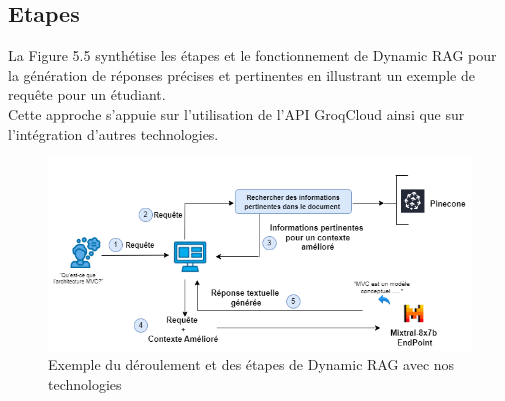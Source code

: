 \subsection{Etapes}
La Figure 5.5 synthétise les étapes et le fonctionnement de Dynamic RAG pour la génération de réponses précises et pertinentes en illustrant un exemple de requête pour un étudiant.\\
Cette approche s'appuie sur l'utilisation de l'API GroqCloud ainsi que sur l'intégration d'autres technologies.
\begin{figure}[H]
    \centering
    \includegraphics[width=1.1\textwidth,height=0.55\textwidth]{images/chp5/fig5.png}
    \caption{Exemple du déroulement et des étapes de Dynamic RAG avec nos technologies}
    \label{fig:Exemple du déroulement et des étapes de Dynamic RAG avec nos technologies}
\end{figure}

